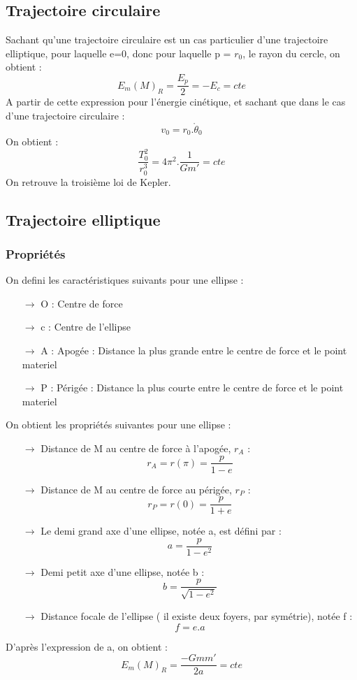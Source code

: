 \subsection{Trajectoire circulaire}
Sachant qu'une trajectoire circulaire est un cas particulier d'une trajectoire elliptique, pour laquelle e=0, donc pour laquelle p = $r_0$, le rayon du cercle, on obtient :
$$E_m(M)_R = \dfrac{E_p}{2} = -E_c = cte$$
A partir de cette expression pour l'énergie cinétique, et sachant que dans le cas d'une trajectoire circulaire :
$$v_0 = r_0.\mathring{\theta}_0$$
On obtient :
$$\dfrac{T_0^2}{r_0^3} = 4\pi^2.\dfrac{1}{Gm'} = cte$$
On retrouve la troisième loi de Kepler.
\subsection{Trajectoire elliptique}
\subsubsection{Propriétés}
On defini les caractéristiques suivants pour une ellipse :
\begin{itemize}
 \item[$\rightarrow$] O : Centre de force
 \item[$\rightarrow$] c : Centre de l'ellipse
 \item[$\rightarrow$] A : Apogée : Distance la plus grande entre le centre de force et le point materiel
 \item[$\rightarrow$] P : Périgée : Distance la plus courte entre le centre de force et le point materiel
\end{itemize}
On obtient les propriétés suivantes pour une ellipse :
\begin{itemize}
 \item[$\rightarrow$] Distance de M au centre de force à l'apogée, $r_A$ : $$r_A = r(\pi) = \dfrac{p}{1-e}$$
 \item[$\rightarrow$] Distance de M au centre de force au périgée, $r_P$ : $$r_P = r(0) = \dfrac{p}{1+e}$$
 \item[$\rightarrow$] Le demi grand axe d'une ellipse, notée a, est défini par : $$a = \dfrac{p}{1-e^2}$$
 \item[$\rightarrow$] Demi petit axe d'une ellipse, notée b : $$b = \dfrac{p}{\sqrt{1-e^2}}$$
 \item[$\rightarrow$] Distance focale de l'ellipse ( il existe deux foyers, par symétrie), notée f : $$f = e.a$$
\end{itemize}
D'après l'expression de a, on obtient :
$$E_m(M)_R = \dfrac{-Gmm'}{2a} = cte$$
